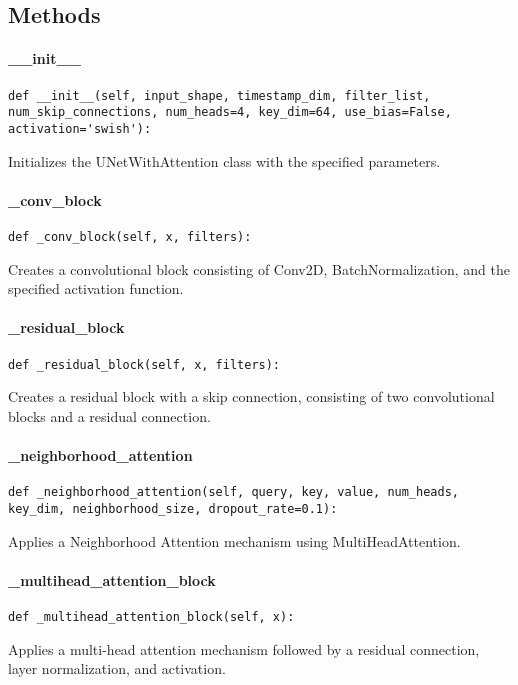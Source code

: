 \documentclass{article}
\begin{document}
\subsection{Methods}

\paragraph{__init__}
\begin{verbatim}
def __init__(self, input_shape, timestamp_dim, filter_list, num_skip_connections, num_heads=4, key_dim=64, use_bias=False, activation='swish'):
\end{verbatim}
Initializes the UNetWithAttention class with the specified parameters.

\paragraph{_conv_block}
\begin{verbatim}
def _conv_block(self, x, filters):
\end{verbatim}
Creates a convolutional block consisting of Conv2D, BatchNormalization, and the specified activation function.

\paragraph{_residual_block}
\begin{verbatim}
def _residual_block(self, x, filters):
\end{verbatim}
Creates a residual block with a skip connection, consisting of two convolutional blocks and a residual connection.

\paragraph{_neighborhood_attention}
\begin{verbatim}
def _neighborhood_attention(self, query, key, value, num_heads, key_dim, neighborhood_size, dropout_rate=0.1):
\end{verbatim}
Applies a Neighborhood Attention mechanism using MultiHeadAttention.

\paragraph{_multihead_attention_block}
\begin{verbatim}
def _multihead_attention_block(self, x):
\end{verbatim}
Applies a multi-head attention mechanism followed by a residual connection, layer normalization, and activation.
\end{document}
